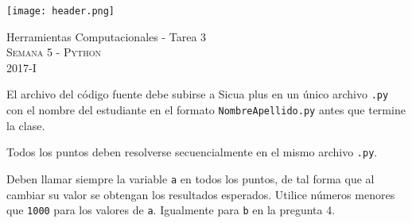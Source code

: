 \documentclass[11pt,letterpaper]{exam}
\begin{document}
\begin{center}

\texttt{[image: header.png]}

\vspace{1.0cm}
{\Large Herramientas Computacionales - Tarea 3} \\
\textsc{Semana 5 - Python}\\
2017-I\\
\end{center}



\vspace{0.5cm}

\noindent
El archivo del c\'odigo fuente debe subirse a Sicua plus en un \'unico archivo \verb'.py' con el nombre del estudiante en el formato \verb"NombreApellido.py" antes que termine la clase.

Todos los puntos deben resolverse secuencialmente en el mismo archivo \verb'.py'.

Deben llamar siempre la variable \verb'a' en todos los puntos, de tal forma que al cambiar su valor se obtengan los resultados esperados. Utilice n\'umeros menores que \verb'1000' para los valores de \verb'a'. Igualmente para \verb'b' en la pregunta 4.

\vspace{0.5cm}
\end{document}

